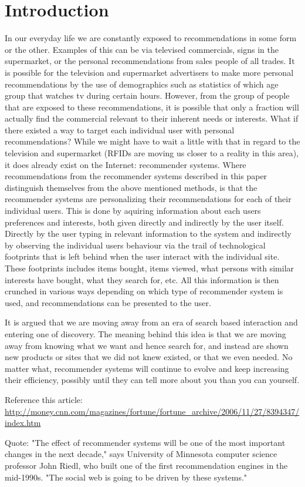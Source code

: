 \section{Introduction}
In our everyday life we are constantly exposed to recommendations in some form or the other. Examples of this can be via televised commercials, signs in the supermarket, or the personal recommendations from sales people of all trades.
It is possible for the television and supermarket advertisers to make more personal recommendations by the use of demographics such as statistics of which age group that watches tv during certain hours. However, from the group of people that are exposed to these recommendations, it is possible that only a fraction will actually find the commercial relevant to their inherent needs or interests. What if there existed a way to target each individual user with personal recommendations? While we might have to wait a little with that in regard to the television and supermarket (RFIDs are moving us closer to a reality in this area), it does already exist on the Internet: recommender systems.
Where recommendations from the recommender systems described in this paper distinguish themselves from the above mentioned methods, is that the recommender systems are personalizing their recommendations for each of their individual users. This is done by aquiring information about each users preferences and interests, both given directly and indirectly by the user itself. Directly by the user typing in relevant information to the system and indirectly by observing the individual users behaviour via the trail of technological footprints that is left behind when the user interact with the individual site. These footprints includes items bought, items viewed, what persons with similar interests have bought, what they search for, etc. All this information is then crunched in various ways depending on which type of recommender system is used, and recommendations can be presented to the user.

It is argued that we are moving away from an era of search based interaction and entering one of discovery. The meaning  behind this idea is that we are moving away from knowing what we want and hence search for, and instead are shown new products or sites that we did not knew existed, or that we even needed. No matter what, recommender systems will continue to evolve and keep increasing their efficiency, possibly until they can tell more about you than you can yourself.


Reference this article: \url{http://money.cnn.com/magazines/fortune/fortune_archive/2006/11/27/8394347/index.htm}

Quote:
"The effect of recommender systems will be one of the most important changes in the next decade," says University of Minnesota computer science professor John Riedl, who built one of the first recommendation engines in the mid-1990s. "The social web is going to be driven by these systems."